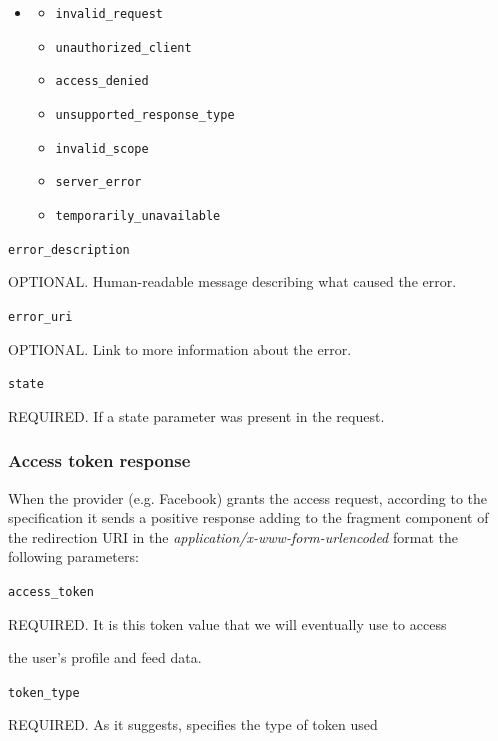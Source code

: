 \begin{itemize}
\item[] \begin{itemize}
        \item \texttt{invalid\_request}
        \item \texttt{unauthorized\_client}
        \item \texttt{access\_denied}
        \item \texttt{unsupported\_response\_type}
        \item \texttt{invalid\_scope}
        \item \texttt{server\_error}
        \item \texttt{temporarily\_unavailable}
\end{itemize}
\end{itemize}

\texttt{error\_description}

\hspace{0.5cm}OPTIONAL. Human-readable message describing what caused the error.

\texttt{error\_uri}

\hspace{0.5cm}OPTIONAL. Link to more information about the error.

\texttt{state}

\hspace{0.5cm}REQUIRED. If a state parameter was present in the request.

\subsubsection{Access token response}
When the provider (e.g. Facebook) grants the access request, according to the specification it sends a positive response adding to the fragment component of the redirection URI in the \textit{application/x-www-form-urlencoded} format the following parameters:

\texttt{access\_token}

\hspace{0.5cm}REQUIRED. It is this token value that we will eventually use to access

\hspace{0.5cm}the user's profile and feed data.

\texttt{token\_type}

\hspace{0.5cm}REQUIRED. As it suggests, specifies the type of token used

